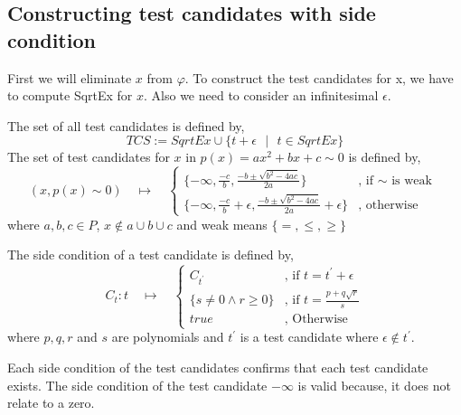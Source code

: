 \subsection{Constructing test candidates with side condition}
First we will eliminate $x$ from $\varphi$. To construct the test candidates for x, we have to compute SqrtEx for $x$. Also we need to consider an infinitesimal $\epsilon$.
\begin{mdframed}[hidealllines=true,backgroundcolor=blue!20,innerleftmargin=3pt,innerrightmargin=3pt,leftmargin=-3pt,rightmargin=-3pt]
	\begin{definition}
		\label{def:construction_of_test_candidates}
		The set of all test candidates is defined by,
		$$ TCS := SqrtEx \cup \{t+\epsilon \text{ } \lvert  \text{ }t\in SqrtEx\} $$
		The set of test candidates for $x$ in $p(x) = ax^{2} + bx + c \sim 0$ is defined by,
		$$
		(x, p(x)\sim 0)
		\quad \mapsto \quad 
		\left\{
		\begin{array}{ll}
		{\displaystyle \{-\infty,\frac{-c}{b},\frac{-b \pm \sqrt{b^{2}-4ac}}{2a}\}} 
		& 
		\text{, if }\sim \text{ is weak }
		\\[0.6cm] %
		{\displaystyle \{-\infty,\frac{-c}{b} + \epsilon,\frac{-b \pm \sqrt{b^{2}-4ac}}{2a}+\epsilon\}}
		& 
		\text{, otherwise }
		\end{array}
		\right.$$
		where $a, b, c \in P$, $x\notin a\cup b\cup c $ and weak means $\{=,\leq,\geq\}$
		
		The side condition of a test candidate is defined by,
		$$
		C_t: t
		\quad \mapsto \quad 
		\left\{
		\begin{array}{lll}
		{\displaystyle C_{t^{\prime}}}
		& 
		\text{, if } t = t^{\prime} + \epsilon
		\\[0.6cm] %
		{\displaystyle \{s\neq 0 \wedge r\geq 0\}}
		& 
		\text{, if } t = \frac{p+q\sqrt{r}}{s}
		\\[0.6cm] %
		{\displaystyle true}
		& 
		\text{, Otherwise }
		\end{array}
		\right.$$
		where $p, q, r$ and $s$ are polynomials and $t^{\prime}$ is a test candidate where $\epsilon \notin t^{\prime}$.
	\end{definition}
\end{mdframed}

Each side condition of the test candidates confirms that each test candidate exists. The side condition of the test candidate $-\infty$ is valid because, it does not relate to a zero.

